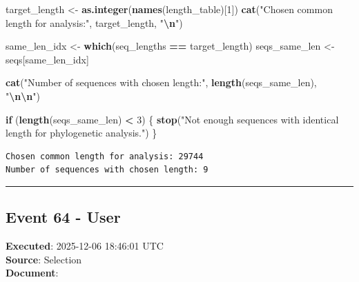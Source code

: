 \documentclass[
  11pt,
]{article}
\newenvironment{Shaded}{\begin{snugshade}}{\end{snugshade}}
\newcommand{\ControlFlowTok}[1]{\textcolor[rgb]{0.13,0.29,0.53}{\textbf{#1}}}
\newcommand{\DecValTok}[1]{\textcolor[rgb]{0.00,0.00,0.81}{#1}}
\newcommand{\FunctionTok}[1]{\textcolor[rgb]{0.13,0.29,0.53}{\textbf{#1}}}
\newcommand{\NormalTok}[1]{#1}
\newcommand{\OtherTok}[1]{\textcolor[rgb]{0.56,0.35,0.01}{#1}}
\newcommand{\SpecialCharTok}[1]{\textcolor[rgb]{0.81,0.36,0.00}{\textbf{#1}}}
\newcommand{\StringTok}[1]{\textcolor[rgb]{0.31,0.60,0.02}{#1}}
\newenvironment{rpoutput}{\vspace{0.5em}\begin{snugshade}}{\end{snugshade}}
\begin{document}
\begin{Shaded}
\begin{Highlighting}[]
\NormalTok{target\_length }\OtherTok{\textless{}{-}} \FunctionTok{as.integer}\NormalTok{(}\FunctionTok{names}\NormalTok{(length\_table)[}\DecValTok{1}\NormalTok{])}
\FunctionTok{cat}\NormalTok{(}\StringTok{"Chosen common length for analysis:"}\NormalTok{, target\_length, }\StringTok{"}\SpecialCharTok{\textbackslash{}n}\StringTok{"}\NormalTok{)}

\NormalTok{same\_len\_idx }\OtherTok{\textless{}{-}} \FunctionTok{which}\NormalTok{(seq\_lengths }\SpecialCharTok{==}\NormalTok{ target\_length)}
\NormalTok{seqs\_same\_len }\OtherTok{\textless{}{-}}\NormalTok{ seqs[same\_len\_idx]}

\FunctionTok{cat}\NormalTok{(}\StringTok{"Number of sequences with chosen length:"}\NormalTok{, }\FunctionTok{length}\NormalTok{(seqs\_same\_len), }\StringTok{"}\SpecialCharTok{\textbackslash{}n\textbackslash{}n}\StringTok{"}\NormalTok{)}

\ControlFlowTok{if}\NormalTok{ (}\FunctionTok{length}\NormalTok{(seqs\_same\_len) }\SpecialCharTok{\textless{}} \DecValTok{3}\NormalTok{) \{}
  \FunctionTok{stop}\NormalTok{(}\StringTok{"Not enough sequences with identical length for phylogenetic analysis."}\NormalTok{)}
\NormalTok{\}}
\end{Highlighting}
\end{Shaded}

\begin{rpoutput}

\begin{verbatim}
Chosen common length for analysis: 29744 
Number of sequences with chosen length: 9 
\end{verbatim}

\end{rpoutput}

\begin{center}\rule{0.5\linewidth}{0.5pt}\end{center}

\subsection{Event 64 - User}\label{event-64---user}

\textbf{Executed}: 2025-12-06 18:46:01 UTC\\
\textbf{Source}: Selection\\
\textbf{Document}:
\end{document}
